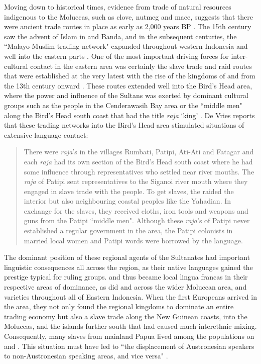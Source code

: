 Moving down to historical times, evidence from trade of natural resources indigenous to the Moluccas, such as clove, nutmeg and mace, suggests that there were ancient trade routes in place as early as 2,000 years BP \citep{klamer2008east}. The 15th century saw the advent of Islam in  and Banda, and in the subsequent centuries, the ``Malayo-Muslim trading network" expanded throughout western Indonesia and well into the eastern parts \citep{klamer2008east}. One of the most important driving forces for inter-cultural contact in the eastern area was certainly the slave trade and raid routes that were established at the very latest with the rise of the kingdoms of  and  from the 13th century onward \citep{klamer2008east}. These routes extended well into the Bird's Head area, where the power and influence of the Sultans was exerted by dominant cultural groups such as the  people in the Cenderawasih Bay area \citep[2]{vanheuvel2006} or the  ``middle men" along the Bird's Head south coast that had the title \textit{raja} `king' \citep[2]{devries2004}. De Vries reports that these trading networks into the Bird's Head area stimulated situations of extensive language contact:

\begin{quote}There were \textit{raja}'s in the villages Rumbati, Patipi, Ati-Ati and Fatagar and each \textit{raja} had its own section of the Bird's Head south coast where he had some influence through representatives who settled near river mouths. The \textit{raja} of Patipi sent representatives to the Siganoi river mouth where they engaged in slave trade with the  people. To get slaves, the  raided the interior but also neighbouring coastal peoples like the Yahadian. In exchange for the slaves, they received cloths, iron tools and weapons and guns from the Patipi ``middle men". Although these \textit{raja}'s of Patipi never established a regular government in the  area, the Patipi colonists in  married local women and Patipi words were borrowed by the  language.\end{quote}

The dominant position of these regional agents of the Sultanates had important linguistic consequences all across the region, as their native languages gained the prestige typical for ruling groups.  and  thus became local lingua francas in their respective areas of dominance, as did  and  across the wider Moluccan area, and  varieties throughout all of Eastern Indonesia. When the first Europeans arrived in the area, they not only found the regional kingdoms to dominate an entire trading economy but also a slave trade along the New Guinean coasts, into the Moluccas, and the islands further south that had caused much interethnic mixing. Consequently, many slaves from mainland Papua lived among the populations on  and . This situation must have led to ``the displacement of Austronesian speakers to non-Austronesian speaking areas, and vice versa" \citep[105f.]{klamer2008east}.

